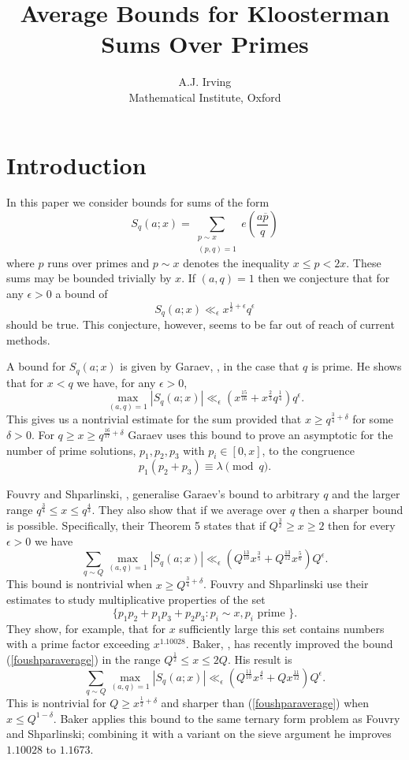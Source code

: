 \documentclass[12pt]{article}
\title{Average Bounds for Kloosterman Sums Over Primes}
\author{A.J. Irving\\
Mathematical Institute, Oxford}
\date{}
\newcommand{\twosum}[2]{\sum_{\substack{#1\\#2}}}
\begin{document}
\maketitle

\section{Introduction}

In this paper we consider bounds for sums of the form 
$$S_q(a;x)=\twosum{p\sim x}{(p,q)=1}e(\frac{a\overline p}{q})$$
where $p$ runs over primes and $p\sim x$ denotes the inequality $x\leq p<2x$.  These sums may be bounded trivially by $x$. If $(a,q)=1$ then we conjecture that for any $\epsilon>0$ a bound of 
$$S_q(a;x)\ll_\epsilon x^{\frac12+\epsilon}q^\epsilon$$   
should be true.  This conjecture, however, seems to be far out of reach of current methods.

A bound for $S_q(a;x)$ is given by Garaev, \cite{garaev}, in the case that $q$ is prime.  He shows that for $x<q$ we have, for any $\epsilon>0$,  
$$\max_{(a,q)=1}|S_q(a;x)|\ll_\epsilon (x^{\frac{15}{16}}+x^{\frac23}q^{\frac14})q^\epsilon.$$
This gives us a nontrivial estimate for the sum provided that $x\geq
q^{\frac34+\delta}$ for some $\delta>0$.  For $q\geq x\geq
q^{\frac{16}{17}+\delta}$  Garaev uses this bound to prove an
asymptotic for the number of prime solutions, $p_1,p_2,p_3$ with $p_i\in [0,x]$, to the congruence 
$$p_1(p_2+p_3)\equiv \lambda\pmod q.$$

Fouvry and Shparlinski, \cite{foushpar}, generalise Garaev's  bound to arbitrary $q$ and the larger range $q^{\frac34}\leq x\leq q^{\frac43}$.  They also show that if we average over $q$ then a sharper bound is possible.  Specifically, their Theorem 5 states that if $Q^{\frac32}\geq x\geq 2$ then for every $\epsilon>0$ we have 
\begin{equation}\label{foushparaverage}
\sum_{q\sim Q}\max_{(a,q)=1}|S_q(a;x)|\ll_\epsilon (Q^{\frac{13}{10}}x^{\frac35}+Q^{\frac{13}{12}}x^{\frac56})Q^\epsilon.
\end{equation}
This bound is  nontrivial when $x\geq Q^{\frac34+\delta}$.  Fouvry and Shparlinski use their estimates to study multiplicative properties of the set 
$$\{p_1p_2+p_1p_3+p_2p_3:p_i\sim x,p_i\text{ prime }\}.$$
They show, for example, that for $x$ sufficiently large this set contains numbers with a prime factor exceeding $x^{1.10028}$.  Baker, \cite[Theorem 2]{baker}, has recently improved the bound (\ref{foushparaverage}) in the range $Q^{\frac12}\leq x\leq 2Q$. His result is 
 \begin{equation}\label{bakeraverage}
\sum_{q\sim Q}\max_{(a,q)=1}|S_q(a;x)|\ll_\epsilon (Q^{\frac{11}{10}}x^{\frac45}+Qx^{\frac{11}{12}})Q^\epsilon.
\end{equation}
This  is nontrivial for $Q\geq x^{\frac12+\delta}$ and sharper than (\ref{foushparaverage}) when $x\leq Q^{1-\delta}$.  Baker applies this bound to the same ternary form problem as Fouvry and Shparlinski; combining it with a variant on the sieve argument he improves $1.10028$ to $1.1673$.
\end{document}
